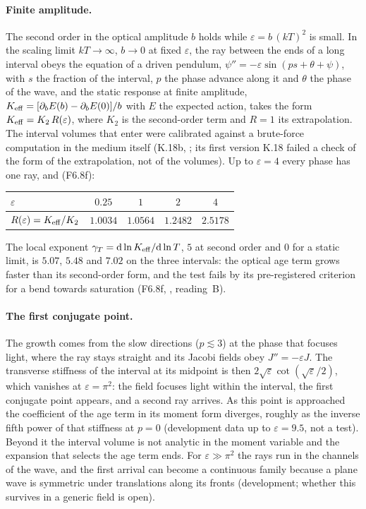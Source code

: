 \paragraph{Finite amplitude.} The second order in the optical amplitude $b$ holds while $\varepsilon=b\,(kT)^2$ is
small. In the scaling limit $kT\to\infty$, $b\to0$ at fixed $\varepsilon$, the ray between the ends of a long
interval obeys the equation of a driven pendulum, $\psi''=-\varepsilon\sin(ps+\theta+\psi)$, with $s$ the
fraction of the interval, $p$ the phase advance along it and $\theta$ the phase of the wave, and the static response
at finite amplitude, $K_{\rm eff}=[\partial_bE(b)-\partial_bE(0)]/b$ with $E$ the expected action, takes the form
$K_{\rm eff}=K_2\,R(\varepsilon)$, where $K_2$ is the second-order term and $R=1$ its extrapolation. The interval
volumes that enter were calibrated against a brute-force computation in the medium itself (K.18b,
; its first version K.18 failed a check of the form of the extrapolation, not of the volumes).
Up to $\varepsilon=4$ every phase has one ray, and (F6.8f):
\begin{center}
\begin{tabular}{lcccc}
\toprule
$\varepsilon$ & $0.25$ & $1$ & $2$ & $4$\\
\midrule
$R(\varepsilon)=K_{\rm eff}/K_2$ & $1.0034$ & $1.0564$ & $1.2482$ & $2.5178$\\
\bottomrule
\end{tabular}
\end{center}
The local exponent $\gamma_T=\mathrm{d}\ln K_{\rm eff}/\mathrm{d}\ln T$, $5$ at second order and $0$ for a static limit, is
$5.07$, $5.48$ and $7.02$ on the three intervals: the optical age term grows faster than its second-order form, and
the test fails by its pre-registered criterion for a bend towards saturation (F6.8f, , reading~B).

\paragraph{The first conjugate point.} The growth comes from the slow directions ($p\lesssim3$) at the phase
that focuses light, where the ray stays straight and its Jacobi fields obey $J''=-\varepsilon J$. The transverse
stiffness of the interval at its midpoint is then $2\sqrt\varepsilon\cot(\sqrt\varepsilon/2)$, which vanishes at
$\varepsilon=\pi^2$: the field focuses light within the interval, the first conjugate point appears, and a second ray
arrives. As this point is approached the coefficient of the age term in its moment form diverges, roughly as the
inverse fifth power of that stiffness at $p=0$ (development data up to $\varepsilon=9.5$, not a test). Beyond it
the interval volume is not analytic in the moment variable and the expansion that selects the age term ends. For
$\varepsilon\gg\pi^2$ the rays run in the channels of the wave, and the first arrival can become a continuous
family because a plane wave is symmetric under translations along its fronts (development; whether this survives
in a generic field is open).

